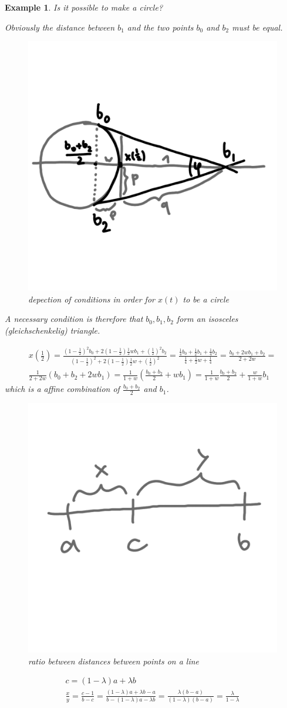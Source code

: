\documentclass[]{article}
\newtheorem{example}{Example}
\begin{document}
\begin{example}
	Is it possible to make a circle?
	
	Obviously the distance between $b_1$ and the two points $b_0$ and $b_2$ must be equal.
	
	\begin{figure}[h!]
		\centering
		\includegraphics[width=0.3\linewidth]{figures/nurbs_circle}
		\caption{depection of conditions in order for $x(t)$ to be a circle}
		\label{fig:nurbs_circle}
	\end{figure}
	
	A necessary condition is therefore that $b_0, b_1, b_2$ form an isosceles (gleichschenkelig) triangle.
	
	
	\begin{align*}
		x(\frac{1}{2}) = \frac{(1-\frac{1}{2})^2b_0 + 2(1-\frac{1}{2})\frac{1}{2}wb_1 + (\frac{1}{2})^2b_2}{(1-\frac{1}{2})^2 + 2(1-\frac{1}{2})\frac{1}{2}w + (\frac{1}{2})^2} = \frac{\frac{1}{4}b_0 + \frac{1}{2}b_1 + \frac{1}{4}b_2}{\frac{1}{4} + \frac{1}{2}w + \frac{1}{4}} = \frac{b_0 + 2wb_1 + b_2}{2+2w} =\\
		\frac{1}{2+2w}(b_0 + b_2 + 2wb_1) = \frac{1}{1+w}(\frac{b_0+b_2}{2} +wb_1) = \frac{1}{1+w} \frac{b_0 + b_2}{2} + \frac{w}{1+w} b_1
	\end{align*}
	which is a affine combination of $\frac{b_0 + b_2}{2}$ and $b_1$.
	
	\begin{figure}[h!]
		\centering
		\includegraphics[width=0.3\linewidth]{figures/nurbs_ratio}
		\caption{ratio between distances between points on a line}
		\label{fig:nurbs_ratio}
	\end{figure}
	
	\begin{align*}
		c = (1-\lambda)a + \lambda b\\
		\frac{x}{y} = \frac{c-1}{b-c} = \frac{(1-\lambda)a + \lambda b - a}{b - (1-\lambda) a - \lambda b} = \frac{\lambda(b-a)}{(1-\lambda)(b-a)} = \frac{\lambda}{1-\lambda}
	\end{align*}
	

\end{example}
\end{document}

